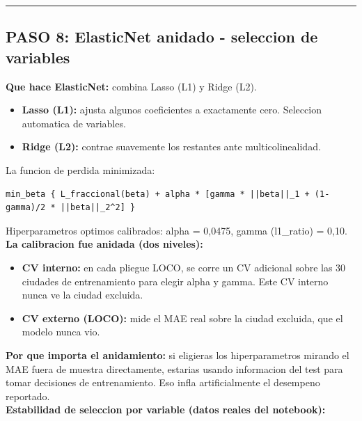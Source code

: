 \documentclass[11pt,a4paper]{article}
\begin{document}
{\vspace{4pt}\noindent\rule{\linewidth}{0.4pt}\vspace{4pt}

\subsection{PASO 8: ElasticNet anidado - seleccion de variables}

\textbf{Que hace ElasticNet:} combina Lasso (L1) y Ridge (L2).\\[2pt]
\begin{itemize}[noitemsep,topsep=2pt]
\item \textbf{Lasso (L1):} ajusta algunos coeficientes a exactamente cero. Seleccion automatica de variables.
\item \textbf{Ridge (L2):} contrae suavemente los restantes ante multicolinealidad.
\end{itemize}

La funcion de perdida minimizada:\\[2pt]
\begin{lstlisting}
min_beta { L_fraccional(beta) + alpha * [gamma * ||beta||_1 + (1-gamma)/2 * ||beta||_2^2] }
\end{lstlisting}

Hiperparametros optimos calibrados: alpha = 0,0475, gamma (l1_ratio) = 0,10.\\[2pt]

\textbf{La calibracion fue anidada (dos niveles):}\\[2pt]

\begin{itemize}[noitemsep,topsep=2pt]
\item \textbf{CV interno:} en cada pliegue LOCO, se corre un CV adicional sobre las 30 ciudades de entrenamiento para elegir alpha y gamma. Este CV interno nunca ve la ciudad excluida.
\item \textbf{CV externo (LOCO):} mide el MAE real sobre la ciudad excluida, que el modelo nunca vio.
\end{itemize}

\textbf{Por que importa el anidamiento:} si eligieras los hiperparametros mirando el MAE fuera de muestra directamente, estarias usando informacion del test para tomar decisiones de entrenamiento. Eso infla artificialmente el desempeno reportado.\\[2pt]

\textbf{Estabilidad de seleccion por variable (datos reales del notebook):}\\[2pt]

}
\end{document}
